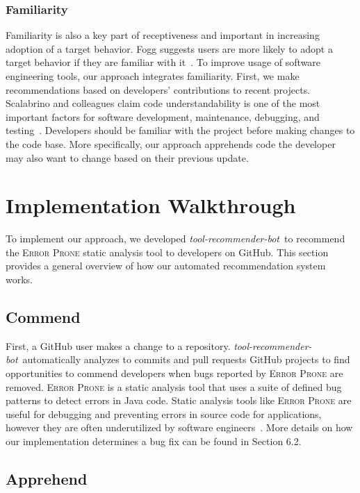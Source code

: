\documentclass[sigconf,review,anonymous]{acmart}
\newcommand{\tool}{\textsl{tool-recommender-bot}}
\begin{document}
\subsubsection{Familiarity}

Familiarity is also a key part of receptiveness and important in increasing adoption of a target behavior. Fogg suggests users are more likely to adopt a target behavior if they are familiar with it~\cite{FoggPersuasive}. To improve usage of software engineering tools, our approach integrates familiarity. First, we make recommendations based on developers' contributions to recent projects. Scalabrino and colleagues claim code understandability is one of the most important factors for software development, maintenance, debugging, and testing~\cite{Scalabrino2017Understandability}. Developers should be familiar with the project before making changes to the code base. More specifically, our approach apprehends code the developer may also want to change based on their previous update.

\section{Implementation Walkthrough}

To implement our approach, we developed \tool~to recommend the \textsc{Error Prone} static analysis tool to developers on GitHub. This section provides a general overview of how our automated recommendation system works.

\subsection{Commend}

First, a GitHub user makes a change to a repository. \tool~automatically analyzes to commits and pull requests GitHub projects to find opportunities to commend developers when bugs reported by \textsc{Error Prone} are removed. \textsc{Error Prone} is a static analysis tool that uses a suite of defined bug patterns to detect errors in Java code. Static analysis tools like \textsc{Error Prone} are useful for debugging and preventing errors in source code for applications, however they are often underutilized by software engineers~\cite{Johnson2013Why}. More details on how our implementation determines a bug fix can be found in Section 6.2.

\subsection{Apprehend}
\end{document}
